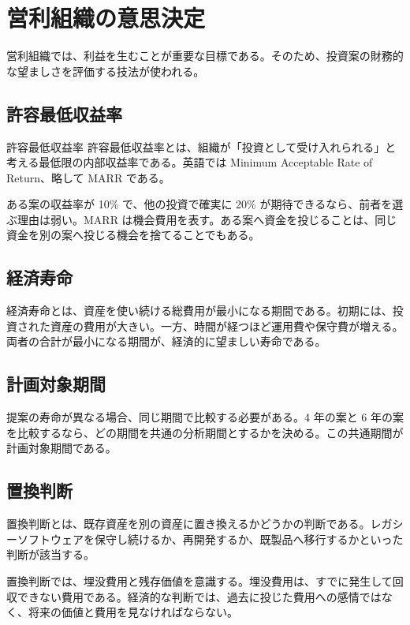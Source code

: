 \documentclass[a4paper,11pt]{article}
\begin{document}
\section{営利組織の意思決定}

営利組織では、利益を生むことが重要な目標である。そのため、投資案の財務的な望ましさを評価する技法が使われる。

\subsection{許容最低収益率}

\begin{defbox}{許容最低収益率}
許容最低収益率とは、組織が「投資として受け入れられる」と考える最低限の内部収益率である。英語では Minimum Acceptable Rate of Return、略して MARR である。
\end{defbox}

ある案の収益率が 10\% で、他の投資で確実に 20\% が期待できるなら、前者を選ぶ理由は弱い。MARR は機会費用を表す。ある案へ資金を投じることは、同じ資金を別の案へ投じる機会を捨てることでもある。

\subsection{経済寿命}

経済寿命とは、資産を使い続ける総費用が最小になる期間である。初期には、投資された資産の費用が大きい。一方、時間が経つほど運用費や保守費が増える。両者の合計が最小になる期間が、経済的に望ましい寿命である。

\subsection{計画対象期間}

提案の寿命が異なる場合、同じ期間で比較する必要がある。4 年の案と 6 年の案を比較するなら、どの期間を共通の分析期間とするかを決める。この共通期間が計画対象期間である。

\subsection{置換判断}

置換判断とは、既存資産を別の資産に置き換えるかどうかの判断である。レガシーソフトウェアを保守し続けるか、再開発するか、既製品へ移行するかといった判断が該当する。

置換判断では、埋没費用と残存価値を意識する。埋没費用は、すでに発生して回収できない費用である。経済的な判断では、過去に投じた費用への感情ではなく、将来の価値と費用を見なければならない。
\end{document}
